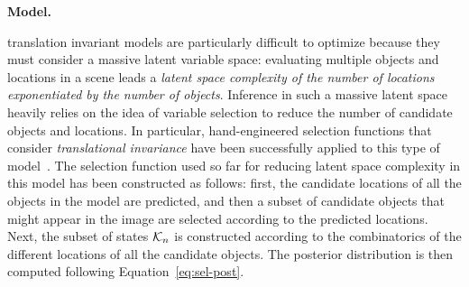 \textbf{Model.}
%

 translation invariant models are particularly difficult to optimize because they must consider a massive latent variable space: evaluating multiple objects and locations in a scene leads a \textit{latent space complexity of the number of locations exponentiated by the number of objects}.
Inference in such a massive latent space heavily relies on the idea of variable selection to reduce the number of candidate objects and locations. In particular, hand-engineered selection functions that consider \emph{translational invariance} have been successfully applied to this type of model~\citep{DaiLucke2012b,DaiLucke2014,DaiEtAl2013}.
%
The selection function used so far for reducing latent space complexity in this model has been constructed as follows: first, the candidate locations of all the objects in the model are predicted, and then a subset of candidate objects that might appear in the image are selected according to the predicted locations.  Next, the subset of states $\mathcal{K}_{n}$ is constructed according to the combinatorics of the different locations of all the candidate objects.
The posterior distribution is then computed following Equation~\eqref{eq:sel-post}.


